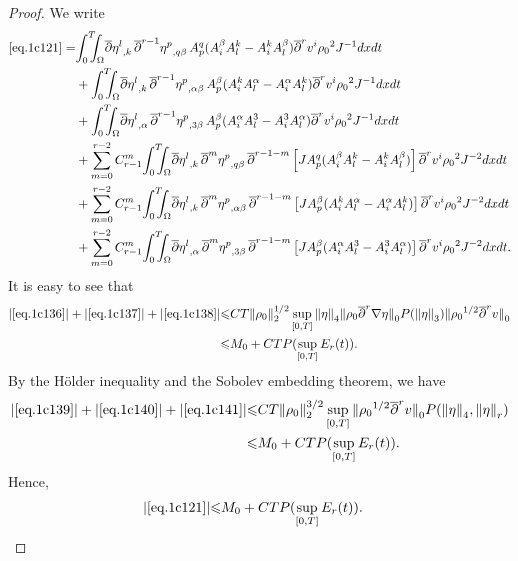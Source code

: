 \documentclass[12pt,twoside,reqno]{amsart}
\numberwithin{equation}{section}
\theoremstyle{definition}
\theoremstyle{remark}
\begin{document}
\begin{proof}
We write
\begin{align}
  \eqref{eq.1c121}=&{\int_0^T\!\!\!\!\int_\Omega }  {\overline{\partial}} {{{\eta^l}}_{,{k}}\,}{\overline{\partial}}^{r-1}{{{\eta^p}}_{,{q\beta}}\,}A^q_p(A^\beta_iA^k_l-A^k_iA^\beta_l) {\overline{\partial}}^r v^i{\rho_0}^2  J^{-1}dxdt\label{eq.1c136}\\
  &+{\int_0^T\!\!\!\!\int_\Omega }  {\overline{\partial}} {{{\eta^l}}_{,{k}}\,}{\overline{\partial}}^{r-1}{{{\eta^p}}_{,{\alpha\beta}}\,}A^\beta_p(A^k_iA^\alpha_l-A^\alpha_iA^k_l) {\overline{\partial}}^r v^i{\rho_0}^2  J^{-1}dxdt\label{eq.1c137}\\
  &+{\int_0^T\!\!\!\!\int_\Omega }  {\overline{\partial}} {{{\eta^l}}_{,{\alpha}}\,}{\overline{\partial}}^{r-1}{{{\eta^p}}_{,{3\beta}}\,}A^\beta_p(A^\alpha_iA^3_l-A^3_iA^\alpha_l) {\overline{\partial}}^r v^i{\rho_0}^2  J^{-1}dxdt\label{eq.1c138}\\
  &+\sum_{m=0}^{r-2}C_{r-1}^m{\int_0^T\!\!\!\!\int_\Omega }  {\overline{\partial}} {{{\eta^l}}_{,{k}}\,}{\overline{\partial}}^m{{{\eta^p}}_{,{q\beta}}\,}{\overline{\partial}}^{r-1-m}\left[JA^q_p(A^\beta_iA^k_l-A^k_iA^\beta_l) \right] {\overline{\partial}}^r v^i{\rho_0}^2  J^{-2}dxdt\label{eq.1c139}\\
  &+\sum_{m=0}^{r-2}C_{r-1}^m{\int_0^T\!\!\!\!\int_\Omega } {\overline{\partial}} {{{\eta^l}}_{,{k}}\,}{\overline{\partial}}^m{{{\eta^p}}_{,{\alpha\beta}}\,}{\overline{\partial}}^{r-1-m}\left[JA^\beta_p(A^k_iA^\alpha_l-A^\alpha_iA^k_l) \right]{\overline{\partial}}^r v^i{\rho_0}^2  J^{-2}dxdt\label{eq.1c140}\\
  &+\sum_{m=0}^{r-2}C_{r-1}^m{\int_0^T\!\!\!\!\int_\Omega } {\overline{\partial}} {{{\eta^l}}_{,{\alpha}}\,}{\overline{\partial}}^m{{{\eta^p}}_{,{3\beta}}\,}{\overline{\partial}}^{r-1-m}\left[JA^\beta_p(A^\alpha_iA^3_l-A^3_iA^\alpha_l) \right]{\overline{\partial}}^r v^i{\rho_0}^2  J^{-2}dxdt.\label{eq.1c141}
\end{align}
It is easy to see that
\begin{align*}
  {\vert{\eqref{eq.1c136}}\vert}+{\vert{\eqref{eq.1c137}}\vert}+{\vert{\eqref{eq.1c138}}\vert}{\leqslant}&CT
  {\Vert{\rho_0}\Vert}_2^{1/2}\sup_{[0,T]} {\Vert{\eta}\Vert}_4{\Vert{{\rho_0} {\overline{\partial}}^r{\nabla}\eta}\Vert}_0
  P({\Vert{\eta}\Vert}_3){\Vert{{\rho_0}^{1/2}{\overline{\partial}}^rv}\Vert}_0\\
  {\leqslant}& M_0+CTP(\sup_{[0,T]}E_r(t)).
\end{align*}
By the H\"older inequality and the Sobolev embedding theorem, we have
\begin{align*}
  {\vert{\eqref{eq.1c139}}\vert}+{\vert{\eqref{eq.1c140}}\vert}+{\vert{\eqref{eq.1c141}}\vert}
  {\leqslant} &CT{\Vert{\rho_0}\Vert}_2^{3/2}\sup_{[0,T]}{\Vert{{\rho_0}^{1/2}{\overline{\partial}}^rv}\Vert}_0 P({\Vert{\eta}\Vert}_4,{\Vert{\eta}\Vert}_r)\\
  {\leqslant}& M_0+CTP(\sup_{[0,T]}E_r(t)).
\end{align*}
Hence,
\begin{align}
  {\vert{\eqref{eq.1c121}}\vert}{\leqslant} &M_0+CTP(\sup_{[0,T]}E_r(t)).
\end{align}


\end{proof}
\end{document}
